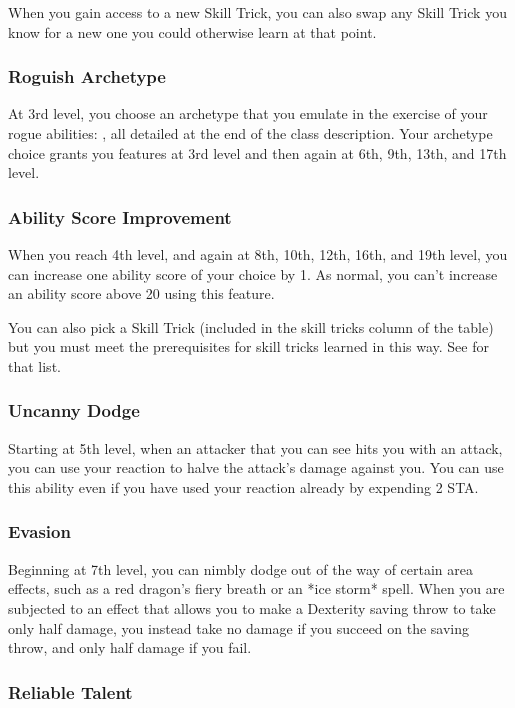 When you gain access to a new Skill Trick, you can also swap any Skill Trick you know for a new one you could otherwise learn at that point.

\subsubsection{Roguish Archetype}

At 3rd level, you choose an archetype that you emulate in the exercise of your rogue abilities: , all detailed at the end of the class description. Your archetype choice grants you features at 3rd level and then again at 6th, 9th, 13th, and 17th level.

\subsubsection{Ability Score Improvement}

When you reach 4th level, and again at 8th, 10th, 12th, 16th, and 19th level, you can increase one ability score of your choice by 1. As normal, you can't increase an ability score above 20 using this feature.

You can also pick a Skill Trick (included in the skill tricks column of the  table) but you must meet the prerequisites for skill tricks learned in this way. See  for that list.

\subsubsection{Uncanny Dodge}

Starting at 5th level, when an attacker that you can see hits you with an attack, you can use your reaction to halve the attack's damage against you. You can use this ability even if you have used your reaction already by expending 2 STA.

\subsubsection{Evasion}

Beginning at 7th level, you can nimbly dodge out of the way of certain area effects, such as a red dragon's fiery breath or an *ice storm* spell. When you are subjected to an effect that allows you to make a Dexterity saving throw to take only half damage, you instead take no damage if you succeed on the saving throw, and only half damage if you fail.

\subsubsection{Reliable Talent}

